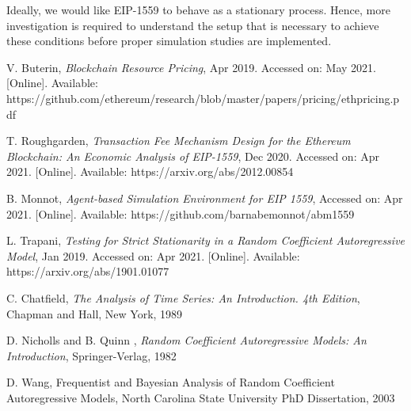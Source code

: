 \documentclass{article}
\begin{document}
Ideally, we would like EIP-1559 to behave as a stationary process. Hence, more investigation is required to understand the setup that is necessary to achieve these conditions before proper simulation studies are implemented.


\begin{thebibliography}{1}

 V. Buterin,  \textit{Blockchain Resource Pricing}, Apr 2019. Accessed on: May 2021. [Online]. Available: https://github.com/ethereum/research/blob/master/papers/pricing/ethpricing.pdf

 T. Roughgarden, \textit{Transaction Fee Mechanism Design for the Ethereum Blockchain: An Economic Analysis of EIP-1559}, Dec 2020. Accessed on: Apr 2021. [Online]. Available: https://arxiv.org/abs/2012.00854

 B. Monnot, \textit{Agent-based Simulation Environment for EIP 1559}, Accessed on: Apr 2021.  [Online]. Available:  https://github.com/barnabemonnot/abm1559

 L. Trapani, \textit{Testing for Strict Stationarity in a Random Coefficient Autoregressive Model}, Jan 2019. Accessed on: Apr 2021. [Online]. Available: https://arxiv.org/abs/1901.01077

 C. Chatfield, \textit{The Analysis of Time Series: An Introduction. 4th Edition}, Chapman and Hall, New York, 1989

 D. Nicholls and B. Quinn , \textit{Random Coefficient Autoregressive Models: An Introduction}, Springer-Verlag, 1982

 D. Wang, Frequentist and Bayesian Analysis of Random Coefficient Autoregressive Models, North Carolina State University PhD Dissertation, 2003



\end{thebibliography}
\end{document}
